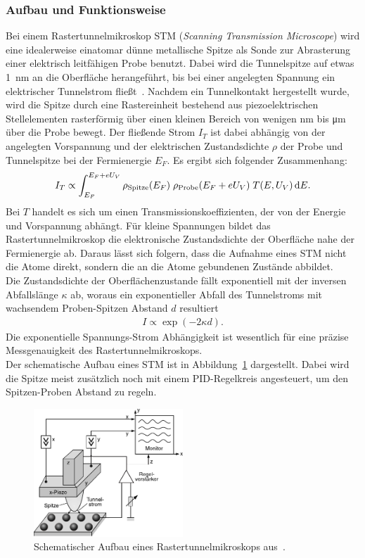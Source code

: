 \documentclass[a4paper,twoside,final]{article}
\begin{document}
\subsubsection{Aufbau und Funktionsweise}\label{sec:STM_Aufbau}
Bei einem Rastertunnelmikroskop STM (\textit{Scanning Transmission Microscope}) wird eine idealerweise einatomar dünne metallische Spitze als Sonde zur Abrasterung einer elektrisch leitfähigen Probe benutzt. Dabei wird die Tunnelspitze auf etwas \SI{1}{\nano\metre} an die Oberfläche herangeführt, bis bei einer angelegten Spannung ein elektrischer Tunnelstrom fließt~\cite{Versuchsanleitung}. Nachdem ein Tunnelkontakt hergestellt wurde, wird die Spitze durch eine Rastereinheit bestehend aus piezoelektrischen Stellelementen rasterförmig über einen kleinen Bereich von wenigen \si{\nano\metre} bis \si{\micro\metre} über die Probe bewegt. Der fließende Strom $I_T$ ist dabei abhängig von der angelegten Vorspannung und der elektrischen Zustandsdichte $\rho$ der Probe und Tunnelspitze bei der Fermienergie $E_F$. Es ergibt sich folgender Zusammenhang:
\begin{align}
  I_T \propto \int_{E_F}^{E_F+ eU_V} \rho_\text{Spitze}(E_F)\;\rho_\text{Probe}(E_F+eU_V) \;T(E,U_V)\,\mathrm{d} E.\label{eqn:Tunnelstrom}
\end{align}
Bei $T$ handelt es sich um einen Transmissionskoeffizienten, der von der Energie und Vorspannung abhängt. Für kleine Spannungen bildet das Rastertunnelmikroskop die elektronische Zustandsdichte der Oberfläche nahe der Fermienergie ab. Daraus lässt sich folgern, dass die Aufnahme eines STM nicht die Atome direkt, sondern die an die Atome gebundenen Zustände abbildet.\\
Die Zustandsdichte der Oberflächenzustande fällt exponentiell mit der inversen Abfallslänge $\kappa$ ab, woraus ein exponentieller Abfall des Tunnelstroms mit wachsendem Proben-Spitzen Abstand $d$ resultiert
\begin{align}
  I \propto \exp(-2\kappa d).
\end{align}
Die exponentielle Spannungs-Strom Abhängigkeit ist wesentlich für eine präzise Messgenauigkeit des Rastertunnelmikroskops.\\
Der schematische Aufbau eines STM ist in Abbildung~\ref{fig:Rastertunnelmikroskop} dargestellt. Dabei wird die Spitze meist zusätzlich noch mit einem PID-Regelkreis angesteuert, um den Spitzen-Proben Abstand zu regeln.
\begin{figure}[htp]
    \centering
    \includegraphics[width=0.5\textwidth]{Bilder/Raster_Tunnelmikroskop.pdf}
    \caption{Schematischer Aufbau eines Rastertunnelmikroskops aus~\cite{Demtroeder}.}
    \label{fig:Rastertunnelmikroskop}
\end{figure}
\end{document}
